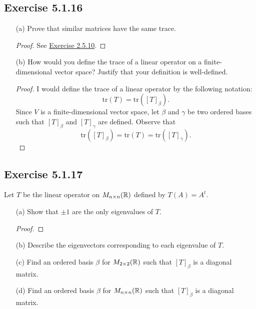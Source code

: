 \subsection*{Exercise 5.1.16} 
\begin{enumerate}
    \item[(a)] Prove that similar matrices have the same trace.
        \begin{proof}
         See {\hyperref[Exercise 2.5.10]{Exercise 2.5.10}}.  
        \end{proof}
    \item[(b)] How would you define the trace of a linear operator on a finite-dimensional vector space? Justify that your definition is well-defined.
        \begin{proof}
        I would define the trace of a linear operator by the following notation:
        \[  \text{tr}(T) = \text{tr}([T]_{\beta}). \]
        Since \( V  \) is a finite-dimensional vector space, let \( \beta \) and \( \gamma \) be two ordered bases such that \( [T]_{\beta} \) and \( [T]_{\gamma} \) are defined. Observe that
        \[  \text{tr}([T]_{\beta}) = \text{tr}(T) = \text{tr}([T]_{\gamma}). \]
        \end{proof}
\end{enumerate}



\subsection*{Exercise  5.1.17} Let \( T  \) be the linear operator on \( {M}_{n \times n}(\mathbb{R} ) \) defined by \( T(A) = A^{t} \).
\begin{enumerate}
    \item[(a)] Show that \( \pm 1  \) are the only eigenvalues of \( T  \).
        \begin{proof}
        
        \end{proof}
    \item[(b)] Describe the eigenvectors corresponding to each eigenvalue of \( T  \).
        \begin{solution}
        
        \end{solution}
    \item[(c)] Find an ordered basis \( \beta  \) for \( {M}_{2 \times 2 }(\mathbb{R} ) \) such that \( [T]_{\beta} \) is a diagonal matrix.
        \begin{solution}
        
        \end{solution}
    \item[(d)] Find an ordered basis \( \beta  \) for \( {M}_{n \times n}(\mathbb{R}) \) such that \( [T]_{\beta} \) is a diagonal matrix.
        \begin{solution}
        
        \end{solution}
\end{enumerate}

